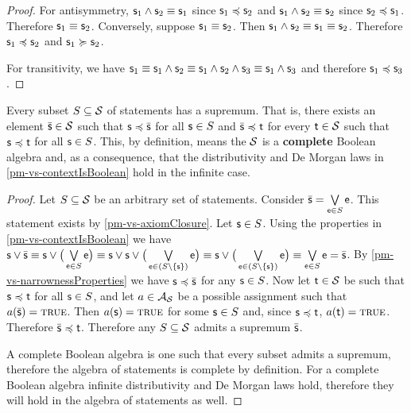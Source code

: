 \begin{mathSection}
\begin{proof}
			For antisymmetry, $\stmt_1 \AND \stmt_2 \equiv \stmt_1$ since $\stmt_1 \narrower \stmt_2$ and $\stmt_1 \AND \stmt_2 \equiv \stmt_2$ since $\stmt_2 \narrower \stmt_1$. Therefore $\stmt_1 \equiv \stmt_2$. Conversely, suppose $\stmt_1 \equiv \stmt_2$. Then $\stmt_1 \AND \stmt_2 \equiv \stmt_1 \equiv \stmt_2$. Therefore $\stmt_1 \narrower \stmt_2$ and $\stmt_1 \broader \stmt_2$.
			
			For transitivity, we have $\stmt_1 \equiv \stmt_1 \AND \stmt_2 \equiv \stmt_1 \AND \stmt_2 \AND \stmt_3 \equiv \stmt_1 \AND \stmt_3$ and therefore $\stmt_1 \narrower \stmt_3$.
		\end{proof}
		
		\begin{prop}
			Every subset $S \subseteq \logCtx$ of statements has a supremum. That is, there exists an element $\bar{\stmt} \in \logCtx$ such that $\stmt \narrower \bar{\stmt}$ for all $\stmt \in S$ and $\bar{\stmt} \narrower \stmt[t]$ for every $\stmt[t] \in \logCtx$ such that $\stmt \narrower \stmt[t]$ for all $\stmt \in S$. This, by definition, means the $\logCtx$ is a \textbf{complete} Boolean algebra and, as a consequence, that the distributivity and De Morgan laws in \ref{pm-vs-contextIsBoolean} hold in the infinite case.
		\end{prop}
		
		\begin{proof}
			Let $S \subseteq \logCtx$ be an arbitrary set of statements. Consider $\bar{\stmt}=\bigOR\limits_{\stmt[e] \in S} \stmt[e]$. This statement exists by \ref{pm-vs-axiomClosure}. Let $\stmt \in S$. Using the properties in \ref{pm-vs-contextIsBoolean} we have $\stmt \OR \bar{\stmt} \equiv \stmt \OR \big(\bigOR\limits_{\stmt[e] \in S} \stmt[e] \big) \equiv \stmt \OR \stmt \OR \big(\bigOR\limits_{\stmt[e] \in (S \setminus \{\stmt\})} \stmt[e] \big) \equiv \stmt \OR \big(\bigOR\limits_{\stmt[e] \in (S \setminus \{\stmt\})} \stmt[e] \big) \equiv \bigOR\limits_{\stmt[e] \in S} \stmt[e] = \bar{\stmt}$. By \ref{pm-vs-narrownessProperties} we have $\stmt \narrower \bar{\stmt}$ for any $\stmt \in S$. Now let $\stmt[t] \in \logCtx$ be such that $\stmt \narrower \stmt[t]$ for all $\stmt \in S$, and let $a \in \pAss$ be a possible assignment such that $a(\bar{\stmt}) = \TRUE$. Then $a(\stmt) = \TRUE$ for some $\stmt \in S$ and, since $\stmt \narrower \stmt[t]$, $a(\stmt[t]) = \TRUE$. Therefore $\bar{\stmt} \narrower \stmt[t]$. Therefore any $S \subseteq \logCtx$ admits a supremum $\bar{\stmt}$.
			
			A complete Boolean algebra is one such that every subset admits a supremum, therefore the algebra of statements is complete by definition. For a complete Boolean algebra infinite distributivity and De Morgan laws hold, therefore they will hold in the algebra of statements as well.
		\end{proof}
		
	\end{mathSection}
	
